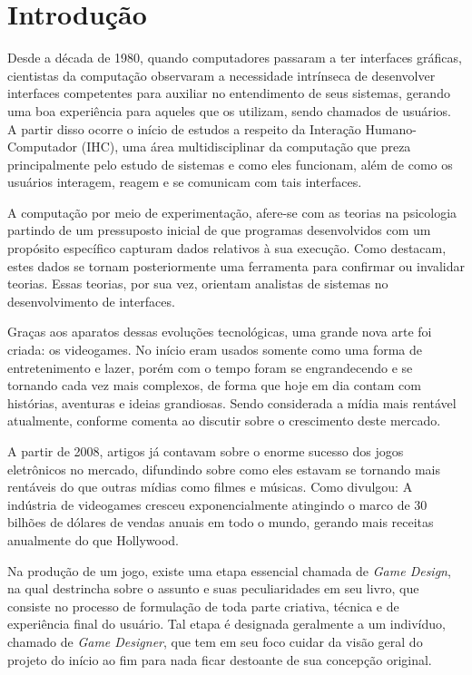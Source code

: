 \chapter{Introdução}
\label{cap:01}

Desde a década de 1980, quando computadores passaram a ter interfaces gráficas, cientistas da computação observaram a necessidade intrínseca de desenvolver interfaces competentes para auxiliar no entendimento de seus sistemas, gerando uma boa experiência para aqueles que os utilizam, sendo chamados de usuários. A partir disso ocorre o início de estudos a respeito da Interação Humano-Computador (IHC), uma área multidisciplinar da computação que preza principalmente pelo estudo de sistemas e como eles funcionam, além de como os usuários interagem, reagem e se comunicam com tais interfaces.

A computação por meio de experimentação, afere-se com as teorias na psicologia partindo de um pressuposto inicial de que programas desenvolvidos com um propósito específico capturam dados relativos à sua execução. Como  destacam, estes dados se tornam posteriormente uma ferramenta para confirmar ou invalidar teorias. Essas teorias, por sua vez, orientam analistas de sistemas no desenvolvimento de interfaces.

Graças aos aparatos dessas evoluções tecnológicas, uma grande nova arte foi criada: os videogames. No início eram usados somente como uma forma de entretenimento e lazer, porém com o tempo foram se engrandecendo e se tornando cada vez mais complexos, de forma que hoje em dia contam com histórias, aventuras e ideias grandiosas. Sendo considerada a mídia mais rentável atualmente, conforme  comenta ao discutir sobre o crescimento deste mercado.

A partir de 2008, artigos já contavam sobre o enorme sucesso dos jogos eletrônicos no mercado, difundindo sobre como eles estavam se tornando mais rentáveis do que outras mídias como filmes e músicas. Como  divulgou: A indústria de videogames cresceu exponencialmente atingindo o marco de 30 bilhões de dólares de vendas anuais em todo o mundo, gerando mais receitas anualmente do que Hollywood.

Na produção de um jogo, existe uma etapa essencial chamada de \textit{Game Design}, na qual  destrincha sobre o assunto e suas peculiaridades em seu livro, que consiste no processo de formulação de toda parte criativa, técnica e de experiência final do usuário. Tal etapa é designada geralmente a um indivíduo, chamado de \textit{Game Designer}, que tem em seu foco cuidar da visão geral do projeto do início ao fim para nada ficar destoante de sua concepção original.


